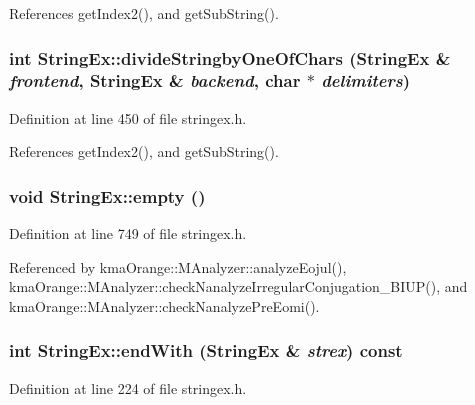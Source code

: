 References getIndex2(), and getSubString().\hypertarget{classStringEx_fbb3e74263c90c4d608923377c306b4a}{
\subsubsection[{divideStringbyOneOfChars}]{\setlength{\rightskip}{0pt plus 5cm}int StringEx::divideStringbyOneOfChars ({\bf StringEx} \& {\em frontend}, \/  {\bf StringEx} \& {\em backend}, \/  char $\ast$ {\em delimiters})}}
\label{classStringEx_fbb3e74263c90c4d608923377c306b4a}




Definition at line 450 of file stringex.h.

References getIndex2(), and getSubString().\hypertarget{classStringEx_7d44674c98832f52ed546659d6309762}{
\subsubsection[{empty}]{\setlength{\rightskip}{0pt plus 5cm}void StringEx::empty ()}}
\label{classStringEx_7d44674c98832f52ed546659d6309762}




Definition at line 749 of file stringex.h.

Referenced by kmaOrange::MAnalyzer::analyzeEojul(), kmaOrange::MAnalyzer::checkNanalyzeIrregularConjugation\_\-BIUP(), and kmaOrange::MAnalyzer::checkNanalyzePreEomi().\hypertarget{classStringEx_07349dc3b2f8579fc030d568e92799e3}{
\subsubsection[{endWith}]{\setlength{\rightskip}{0pt plus 5cm}int StringEx::endWith ({\bf StringEx} \& {\em strex}) const}}
\label{classStringEx_07349dc3b2f8579fc030d568e92799e3}




Definition at line 224 of file stringex.h.


